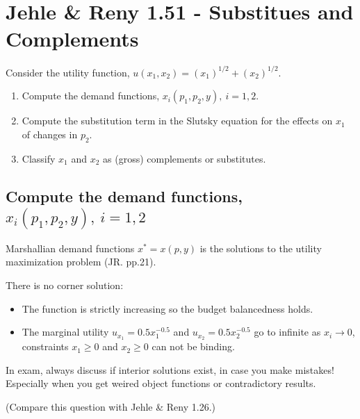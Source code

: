 \documentclass{article}
\begin{document}
\section{Jehle \& Reny 1.51 - Substitues and Complements}
Consider the utility function, $u(x_1, x_2) = (x_1)^{1/2} + (x_2)^{1/2}$.

\begin{enumerate}[label=\alph*.]

\item Compute the demand functions, $x_i(p_1, p_2, y), \ i = 1, 2$.

\item Compute the substitution term in the Slutsky equation for the effects on $x_1$ of changes in $p_2$.

\item Classify $x_1$ and $x_2$ as (gross) complements or substitutes.

\end{enumerate}

\subsection{Compute the demand functions, $x_i(p_1, p_2, y), \ i = 1, 2$}

\begin{mdframed}[backgroundcolor=blue!20,linecolor=white]
Marshallian demand functions $x^* = x(p, y)$ is the solutions 
to the utility maximization problem (JR. pp.21).
\end{mdframed}

There is no corner solution:

\begin{itemize}
\item The function is strictly increasing so the budget balancedness holds. 
\item The marginal utility $u_{x_1} = 0.5x_1^{-0.5}$ and $u_{x_2} = 0.5x_2^{-0.5}$ go to infinite as $x_i \to 0$, constraints $x_1 \ge 0$  and  $x_2 \ge 0$ can not be binding. 
\end{itemize}


\begin{mdframed}[backgroundcolor=yellow!20,linecolor=white]
In exam, always discuss if interior solutions exist, in case you make mistakes! Especially when you get weired object functions or contradictory results.

(Compare this question with Jehle \& Reny 1.26.)
\end{mdframed}
\end{document}
